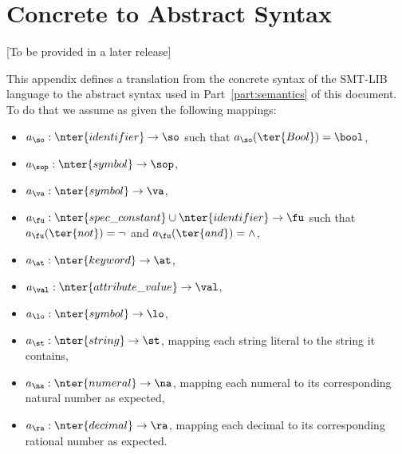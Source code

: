 


\chapter{Concrete to Abstract Syntax} \label{app:concrete-abstract}
\thispagestyle{empty}


[To be provided in a later release]


\newcommand{\tr}[1]{\ulcorner#1\urcorner}

This appendix defines a translation from the concrete syntax
of the SMT-LIB language to the abstract syntax used in 
Part~\ref{part:semantics} of this document.
To do that we assume as given the following mappings:

\begin{itemize}
\item
$a_{\so}: \nter{identifier} \to \so$ such that 
$a_{\so}(\ter{Bool}) = \bool$,
\item
$a_{\sop}: \nter{symbol} \to \sop$,
\item
$a_{\va}: \nter{symbol} \to \va$,
\item
$a_{\fu}: \nter{spec\_constant} \cup \nter{identifier} \to \fu$
such that 
$a_{\fu}(\ter{not}) = \lnot$ and
$a_{\fu}(\ter{and}) = \land$,
\item
$a_{\at}: \nter{keyword} \to \at$,
\item
$a_{\val}: \nter{attribute\_value} \to \val$,
\item
$a_{\lo}: \nter{symbol} \to \lo$,
\item
$a_{\st}: \nter{string} \to \st$,
mapping each string literal to the string it contains,
\item
$a_{\na}: \nter{numeral} \to \na$,
mapping each numeral to its corresponding natural number as expected,
\item
$a_{\ra}: \nter{decimal} \to \ra$,
mapping each decimal to its corresponding rational number as expected.
\end{itemize}

